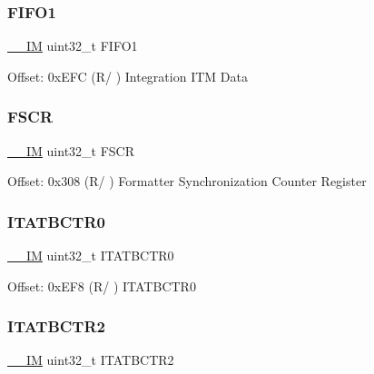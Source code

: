\subsubsection{\texorpdfstring{F\+I\+F\+O1}{FIFO1}}
{\footnotesize\ttfamily \mbox{\hyperlink{core__cm4_8h_a4cc1649793116d7c2d8afce7a4ffce43}{\+\_\+\+\_\+\+IM}} uint32\+\_\+t F\+I\+F\+O1}

Offset\+: 0x\+E\+FC (R/ ) Integration I\+TM Data \mbox{\label{struct_t_p_i___type_a36370b2b0879b7b497f6dd854ba02873}} 
\subsubsection{\texorpdfstring{F\+S\+CR}{FSCR}}
{\footnotesize\ttfamily \mbox{\hyperlink{core__cm4_8h_a4cc1649793116d7c2d8afce7a4ffce43}{\+\_\+\+\_\+\+IM}} uint32\+\_\+t F\+S\+CR}

Offset\+: 0x308 (R/ ) Formatter Synchronization Counter Register \mbox{\label{struct_t_p_i___type_a9954c088735caa505adc113f6c64d812}} 
\subsubsection{\texorpdfstring{I\+T\+A\+T\+B\+C\+T\+R0}{ITATBCTR0}}
{\footnotesize\ttfamily \mbox{\hyperlink{core__cm4_8h_a4cc1649793116d7c2d8afce7a4ffce43}{\+\_\+\+\_\+\+IM}} uint32\+\_\+t I\+T\+A\+T\+B\+C\+T\+R0}

Offset\+: 0x\+E\+F8 (R/ ) I\+T\+A\+T\+B\+C\+T\+R0 \mbox{\label{struct_t_p_i___type_a97fb8816ad001f4910de095aa17d9db5}} 
\subsubsection{\texorpdfstring{I\+T\+A\+T\+B\+C\+T\+R2}{ITATBCTR2}}
{\footnotesize\ttfamily \mbox{\hyperlink{core__cm4_8h_a4cc1649793116d7c2d8afce7a4ffce43}{\+\_\+\+\_\+\+IM}} uint32\+\_\+t I\+T\+A\+T\+B\+C\+T\+R2}

